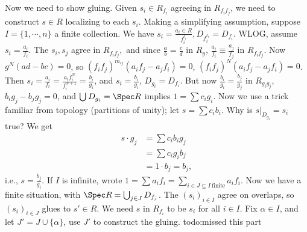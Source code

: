 Now we need to show gluing. Given $s _i  \in R_{f_i }$ agreeing in $R_{f_i  f_j }$, we need to construct $s \in R$ localizing to each $s _i $. Making a simplifying assumption, suppose $I =\{ 1, \cdots ,n\} $ a finite collection.  We have $s_i = \frac{a_i  \in R}{f_i ^{\ell _i } }, D_{f_i  ^{\ell _i }}=D_{f_i }$. WLOG, assume $s_i  = \frac{a_i }{f_i }$. The $s_i , s_j $ agree in $R_{f_i f_j }, $ and since $\frac{a}{b}=\frac{c}{d}$ in $R_y$, $\frac{a_i }{f_i }\equiv \frac{a_j }{f_j }$ in $R_{f_i f_j }$. Now $g^N (ad-bc)=0$, so $(f_if_j )^{m_{ij}}(a_i f_j -a_j f_i )=0$, $(f_i f_j )^N(a_i f_j -a_j f_i )=0$. Then $s _i = \frac{a_i }{f_i }= \frac{a_i  f_i  ^N}{f_i ^{N+1}}=\frac{b_i }{g_i }$, and $s _i  = \frac{b_i }{g_i }$, $D_{g_i }=D_{f_i }$. But now $\frac{b_i }{g_i }=\frac{b_j }{g_j }$ in $R_{g_i  g_j }$, $b_i  g_j -b_j g_j =0$, and $\bigcup_{}D_{g_i }=\Spec R $ implies $1=\sum c_i  g_i $. Now we use  a trick familiar from topology (partitions of unity); let $s= \sum c_i  b_i $. Why is $\left. s \right| _{D_{g_i }}=s_i $ true? We get 
    \begin{align*}
        s \cdot g _j  &= \sum c_i  b_i  g_j \\
                      &= \sum c_i  g_i  b_j \\
                      &=1 \cdot b_j =b_j ,
    \end{align*}i.e., $s=\frac{b_j }{g_i }$.
    If $I$ is infinite, wrote $1=\sum a_i  f_i = \sum _{i \in J \subseteq I \ \text{finite} }a_i  f_i $. Now we have a finite situation, with $\Spec R= \bigcup_{j\in J} D_{f_j }$. The $(s _i  ) _{ i \in I}$ agree on overlaps, so $(s _i ) _{i \in J}$ glues to $s' \in R$. We need $s $ in $R_{f_i }$ to be $s _i  $ for all $i \in I$. Fix $\alpha  \in  I$, and let $J'=J \cup \{\alpha \} $, use $J'$ to construct the gluing. {\color{red}todo:missed this part} 
